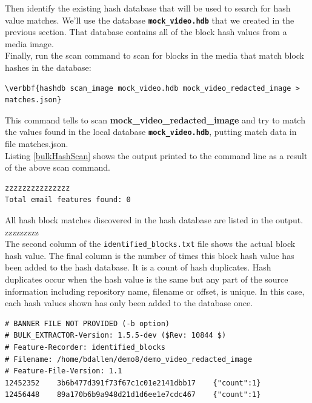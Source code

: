 \documentclass[11pt,fleqn]{article} %
\begin{document}
Then identify the existing hash database that will be used to search for hash value matches. We'll use the database \texttt{\textbf{mock\_video.hdb}} that we created in the previous section. That database contains all of the block hash values from a media image. \\

Finally, run the \hdb scan command to scan for blocks in the media that match block hashes in the database:
\begin{Verbatim}[commandchars=\\\{\}]
\verbbf{hashdb scan_image mock_video.hdb mock_video_redacted_image > matches.json}
\end{Verbatim}
This command tells \hdb to scan \textbf{mock\_video\_redacted\_image} and try to match the values found in the local database \texttt{\textbf{mock\_video.hdb}}, putting match data in file matches.json.\\

Listing \ref{bulkHashScan} shows the output printed to the command line as a result of the above \bulk \hdb scan command. \\

\lstset{style=customfile}
\begin{lstlisting}[float, caption=Output from \bulk \hdb scan, label=bulkHashScan]
zzzzzzzzzzzzzzz
Total email features found: 0
\end{lstlisting}

All hash block matches discovered in the hash database are listed in the output.
zzzzzzzzz\\


The second column of the \texttt{identified\_blocks.txt} file shows the actual block hash value. The final column is the number of times this block hash value has been added to the hash database. It is a count of hash duplicates. Hash duplicates occur when the hash value is the same but any part of the source information including repository name, filename or offset, is unique. In this case, each hash values shown has only been added to the database once.\\

\lstset{style=customfile}
\begin{lstlisting}[float, caption={The \texttt{identified\_blocks.txt} file produced by \bulk's \textit{hashdb} scanner. First column is the forensic path, second is the hash value, and third is the number of times the hash value occurs in the database}, label=identifiedBlocks]
# BANNER FILE NOT PROVIDED (-b option)
# BULK_EXTRACTOR-Version: 1.5.5-dev ($Rev: 10844 $)
# Feature-Recorder: identified_blocks
# Filename: /home/bdallen/demo8/demo_video_redacted_image
# Feature-File-Version: 1.1
12452352	3b6b477d391f73f67c1c01e2141dbb17	{"count":1}
12456448	89a170b6b9a948d21d1d6ee1e7cdc467	{"count":1}
\end{lstlisting}
\end{document}
